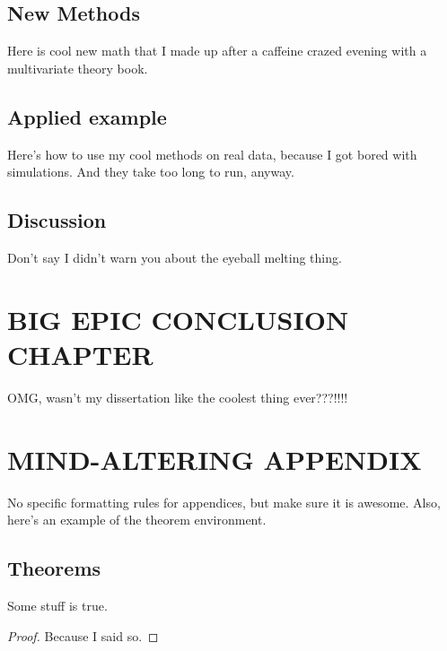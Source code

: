 \documentclass[english]{ucdenver-dissertation}
\begin{document}
\section{New Methods}

Here is cool new math that I made up after a caffeine crazed evening
with a multivariate theory book.




\section{Applied example}

Here's how to use my cool methods on real data, because I got bored with 
simulations.  And they take too long to run, anyway.



\section{Discussion}

Don't say I didn't warn you about the eyeball melting thing.

\newpage

\chapter{BIG EPIC CONCLUSION CHAPTER}

OMG, wasn't my dissertation like the coolest thing ever???!!!!


\renewcommand\bibname{REFERENCES}
\singlespacing





\doublespacing

\ucdappendix

\newpage
\chapter{MIND-ALTERING APPENDIX}

No specific formatting rules for appendices, but make sure it is awesome.  Also, here's an example of the theorem environment.

\section{Theorems}

\begin{theorem}

Some stuff is true. 

\end{theorem} 

\begin{proof}

Because I said so. 
\end{proof}
\end{document}

